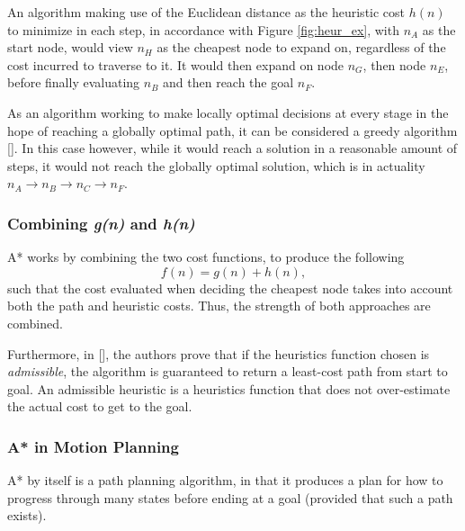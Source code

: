 %	



An algorithm making use of the Euclidean distance as the heuristic cost $h(n)$ to minimize in each step, in accordance with Figure \ref{fig:heur_ex}, with $n_A$ as the start node, would view $n_H$ as the cheapest node to expand on, regardless of the cost incurred to traverse to it. It would then expand on node $n_G$, then node $n_E$, before finally evaluating $n_B$ and then reach the goal $n_F$. 

As an algorithm working to make locally optimal decisions at every stage in the hope of reaching a globally optimal path, it can be considered a greedy algorithm [\citeauthor{Cormen2009}]. In this case however, while it would reach a solution in a reasonable amount of steps, it would not reach the globally optimal solution, which is in actuality $n_A \rightarrow n_B \rightarrow n_C \rightarrow n_F$.

\subsubsection*{Combining \textit{g(n)} and \textit{h(n)}}
A* works by combining the two cost functions, to produce the following
\begin{equation}
f(n) = g(n) + h(n),
\end{equation}
such that the cost evaluated when deciding the cheapest node takes into account both the path and heuristic costs. Thus, the strength of both approaches are combined.

Furthermore, in [\citeauthor{PeterE.HAR}], the authors prove that if the heuristics function chosen is \textit{admissible}, the algorithm is guaranteed to return a least-cost path from start to goal. An admissible heuristic is a heuristics function that does not over-estimate the actual cost to get to the goal.
\subsubsection*{A* in Motion Planning}

A* by itself is a path planning algorithm, in that it produces a plan for how to progress through many states before ending at a goal (provided that such a path exists). 

